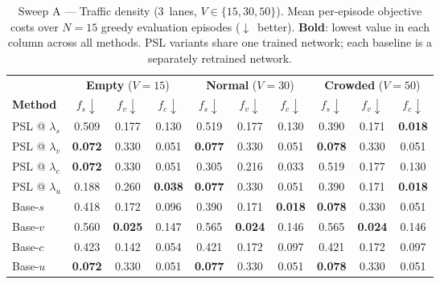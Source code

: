 \documentclass[12pt, letterpaper]{article}
\begin{document}
\begin{table}[!ht]
\centering
\caption{%
  Sweep A --- Traffic density (3~lanes, $V \in \{15, 30, 50\}$).
  Mean per-episode objective costs over $N\!=\!15$ greedy evaluation episodes ($\downarrow$~better).
  \textbf{Bold}: lowest value in each column across all methods.
  PSL variants share one trained network; each baseline is a separately retrained network.
}
\label{tab:sweep_a}
\footnotesize
\setlength{\tabcolsep}{4.5pt}
\begin{tabular}{l | ccc | ccc | ccc}
\toprule
 & \multicolumn{3}{c|}{\textbf{Empty} ($V = 15$)}
 & \multicolumn{3}{c|}{\textbf{Normal} ($V = 30$)}
 & \multicolumn{3}{c}{\textbf{Crowded} ($V = 50$)} \\
\cmidrule(lr){2-4}\cmidrule(lr){5-7}\cmidrule(lr){8-10}
\textbf{Method}
  & $f_s\!\downarrow$ & $f_v\!\downarrow$ & $f_c\!\downarrow$
  & $f_s\!\downarrow$ & $f_v\!\downarrow$ & $f_c\!\downarrow$
  & $f_s\!\downarrow$ & $f_v\!\downarrow$ & $f_c\!\downarrow$ \\
\midrule
PSL @ $\lambda_s$ & 0.509 & 0.177 & 0.130 & 0.519 & 0.177 & 0.130 & 0.390 & 0.171 & \textbf{0.018} \\
PSL @ $\lambda_v$ & \textbf{0.072} & 0.330 & 0.051 & \textbf{0.077} & 0.330 & 0.051 & \textbf{0.078} & 0.330 & 0.051 \\
PSL @ $\lambda_c$ & \textbf{0.072} & 0.330 & 0.051 & 0.305 & 0.216 & 0.033 & 0.519 & 0.177 & 0.130 \\
PSL @ $\lambda_u$ & 0.188 & 0.260 & \textbf{0.038} & \textbf{0.077} & 0.330 & 0.051 & 0.390 & 0.171 & \textbf{0.018} \\
\midrule
Base-$s$          & 0.418 & 0.172 & 0.096 & 0.390 & 0.171 & \textbf{0.018} & \textbf{0.078} & 0.330 & 0.051 \\
Base-$v$          & 0.560 & \textbf{0.025} & 0.147 & 0.565 & \textbf{0.024} & 0.146 & 0.565 & \textbf{0.024} & 0.146 \\
Base-$c$          & 0.423 & 0.142 & 0.054 & 0.421 & 0.172 & 0.097 & 0.421 & 0.172 & 0.097 \\
Base-$u$          & \textbf{0.072} & 0.330 & 0.051 & \textbf{0.077} & 0.330 & 0.051 & \textbf{0.078} & 0.330 & 0.051 \\
\bottomrule
\end{tabular}
\end{table}
\end{document}
